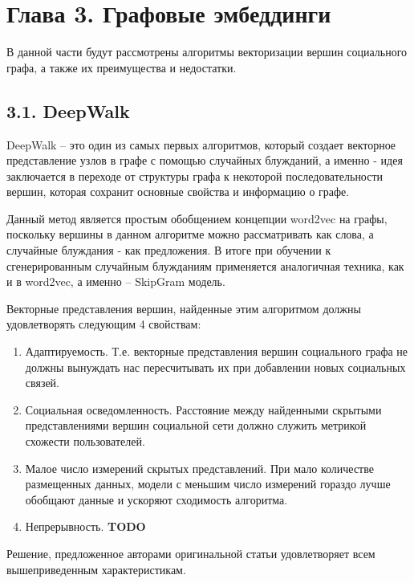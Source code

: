\section{Глава 3. Графовые эмбеддинги}
В данной части будут рассмотрены алгоритмы векторизации вершин социального графа, а также их преимущества и недостатки.

\subsection{3.1. DeepWalk}

DeepWalk \cite{DeepWalk} -- это один из самых первых алгоритмов, который создает векторное представление узлов в графе с помощью случайных блужданий, а именно - идея заключается в переходе от структуры графа к некоторой последовательности вершин, которая сохранит основные свойства и информацию о графе. 

Данный метод является простым обобщением концепции word2vec \cite{word2vec} на графы, поскольку вершины в данном алгоритме можно рассматривать как слова, а случайные блуждания - как предложения. В итоге при обучении к сгенерированным случайным блужданиям применяется аналогичная техника, как и в word2vec, а именно -- SkipGram модель.  

Векторные представления вершин, найденные этим алгоритмом должны удовлетворять следующим 4 свойствам:

\begin{enumerate}
\item Адаптируемость. Т.е. векторные представления вершин социального графа не должны вынуждать нас пересчитывать их при добавлении новых социальных связей.
\item Социальная осведомленность. Расстояние между найденными скрытыми представлениями вершин социальной сети должно служить метрикой схожести пользователей.
\item Малое число измерений скрытых представлений. При мало количестве размещенных данных, модели с меньшим число измерений гораздо лучше обобщают данные и ускоряют сходимость алгоритма.
\item Непрерывность. \textbf{TODO}
\end{enumerate}

Решение, предложенное авторами оригинальной статьи удовлетворяет всем вышеприведенным характеристикам.






\clearpage